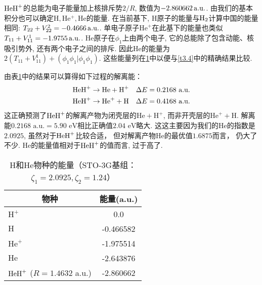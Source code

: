 $\mathrm{HeH}^+$的总能为电子能量加上核排斥势$2/R$, 数值为$-2.860662\,\mathrm{a.u.}$. 
由我们的基本积分也可以确定$\mathrm{H,He^+,He}$的能量. 
在当前基下, $\mathrm{H}$原子的能量与$\mathrm{H}_2$计算中国的能量相同: $T_{22}+V_{22}^2=-0.4666\,\mathrm{a.u.}$. 
单电子原子$\mathrm{He}^+$在此基下的能量也类似$T_{11}+V_{11}^1=-1.9755\,\mathrm{a.u.}$. 
$\mathrm{He}$原子在$\phi_1$上由两个电子, 它的总能除了包含动能、核吸引势外, 还有两个电子之间的排斥. 
因此$\mathrm{He}$的能量为$2(T_{11}+V_{11}^1)+(\phi_1\phi_1|\phi_1\phi_1)$. 
这些能量列在\ref{t3.6}中以便与\ref{t3.4}中的精确结果比较.

由表\ref{t3.6}中的结果可以算得如下过程的解离能：
\begin{align}
	\mathrm{HeH}^+ & \to \text{He} + \text{H}^+ \quad \Delta E = 0.2168\,\, \text{a.u.}\\
	\mathrm{HeH}^+ & \to \text{He}^+ + \text{H} \quad \Delta E = 0.4168\,\, \text{a.u.}
\end{align}
这正确预测了$\mathrm{HeH}^+$的解离产物为闭壳层的$\text{He}+\text{H}^+$, 
而非开壳层的$\text{He}^++\text{H}$. 
解离能$0.2168\,\,\text{a.u.}=5.90\,\,\text{eV}$相比正确值$2.04\,\,\text{eV}$略大.
这这主要因为我们的$\text{He}$的指数是$2.0925$, 
虽然对于$\mathrm{HeH}^+$比较合适， 
但对解离产物$\text{He}$的最优值$1.6875$而言，
仍大了不少. 
$\text{He}$的能量值相对于$\mathrm{HeH}^+$的值而言, 
过于高了.

\begin{table}[h]
	\centering\caption{$\text{H}$和$\text{He}$物种的能量（STO-3G基组： $\zeta_1=2.0925,\zeta_2=1.24$）}
	\begin{tabular}{lc}
		\hline
		\multicolumn{1}{c}{物种} & 能量(a.u.)  \\ \hline
		$\text{H}^+$             &    0.0    \\
		$\text{H}$               & -0.466582 \\
		$\text{He}^+$            & -1.975514 \\
		$\text{He}$              & -2.643876 \\
		$\mathrm{HeH}^+$ ($R=1.4632$ a.u.) & -2.860662 \\ \hline
	\end{tabular}
	\label{t3.6}
\end{table}

